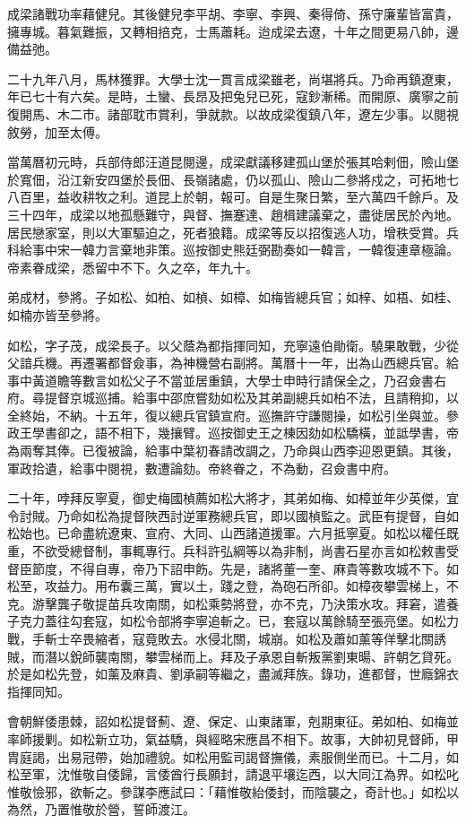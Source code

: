 \begin{pinyinscope}
成梁諸戰功率藉健兒。其後健兒李平胡、李寧、李興、秦得倚、孫守廉輩皆富貴，擁專城。暮氣難振，又轉相掊克，士馬蕭耗。迨成梁去遼，十年之間更易八帥，邊備益弛。

二十九年八月，馬林獲罪。大學士沈一貫言成梁雖老，尚堪將兵。乃命再鎮遼東，年已七十有六矣。是時，土蠻、長昂及把兔兒已死，寇鈔漸稀。而開原、廣寧之前復開馬、木二市。諸部耽市賞利，爭就款。以故成梁復鎮八年，遼左少事。以閱視敘勞，加至太傅。

當萬曆初元時，兵部侍郎汪道昆閱邊，成梁獻議移建孤山堡於張其哈剌佃，險山堡於寬佃，沿江新安四堡於長佃、長嶺諸處，仍以孤山、險山二參將戍之，可拓地七八百里，益收耕牧之利。道昆上於朝，報可。自是生聚日繁，至六萬四千餘戶。及三十四年，成梁以地孤懸難守，與督、撫蹇達、趙楫建議棄之，盡徙居民於內地。居民戀家室，則以大軍驅迫之，死者狼籍。成梁等反以招復逃人功，增秩受賞。兵科給事中宋一韓力言棄地非策。巡按御史熊廷弼勘奏如一韓言，一韓復連章極論。帝素眷成梁，悉留中不下。久之卒，年九十。

弟成材，參將。子如松、如柏、如楨、如樟、如梅皆總兵官；如梓、如梧、如桂、如楠亦皆至參將。

如松，字子茂，成梁長子。以父蔭為都指揮同知，充寧遠伯勛衛。驍果敢戰，少從父諳兵機。再遷署都督僉事，為神機營右副將。萬曆十一年，出為山西總兵官。給事中黃道瞻等數言如松父子不當並居重鎮，大學士申時行請保全之，乃召僉書右府。尋提督京城巡捕。給事中邵庶嘗劾如松及其弟副總兵如柏不法，且請稍抑，以全終始，不納。十五年，復以總兵官鎮宣府。巡撫許守謙閱操，如松引坐與並。參政王學書卻之，語不相下，幾攘臂。巡按御史王之棟因劾如松驕橫，並詆學書，帝為兩奪其俸。已復被論，給事中葉初春請改調之，乃命與山西李迎恩更鎮。其後，軍政拾遺，給事中閱視，數遭論劾。帝終眷之，不為動，召僉書中府。

二十年，哱拜反寧夏，御史梅國楨薦如松大將才，其弟如梅、如樟並年少英傑，宜令討賊。乃命如松為提督陜西討逆軍務總兵官，即以國楨監之。武臣有提督，自如松始也。已命盡統遼東、宣府、大同、山西諸道援軍。六月抵寧夏。如松以權任既重，不欲受總督制，事輒專行。兵科許弘綱等以為非制，尚書石星亦言如松敕書受督臣節度，不得自專，帝乃下詔申飭。先是，諸將董一奎、麻貴等數攻城不下。如松至，攻益力。用布囊三萬，實以土，踐之登，為砲石所卻。如樟夜攀雲梯上，不克。游擊龔子敬提苗兵攻南關，如松乘勢將登，亦不克，乃決策水攻。拜窘，遣養子克力蓋往勾套寇，如松令部將李寧追斬之。已，套寇以萬餘騎至張亮堡。如松力戰，手斬士卒畏縮者，寇竟敗去。水侵北關，城崩。如松及蕭如薰等佯擊北關誘賊，而潛以銳師襲南關，攀雲梯而上。拜及子承恩自斬叛黨劉東暘、許朝乞貸死。於是如松先登，如薰及麻貴、劉承嗣等繼之，盡滅拜族。錄功，進都督，世廕錦衣指揮同知。

會朝鮮倭患棘，詔如松提督薊、遼、保定、山東諸軍，剋期東征。弟如柏、如梅並率師援剿。如松新立功，氣益驕，與經略宋應昌不相下。故事，大帥初見督師，甲胄庭謁，出易冠帶，始加禮貌。如松用監司謁督撫儀，素服側坐而已。十二月，如松至軍，沈惟敬自倭歸，言倭酋行長願封，請退平壤迄西，以大同江為界。如松叱惟敬憸邪，欲斬之。參謀李應試曰：「藉惟敬紿倭封，而陰襲之，奇計也。」如松以為然，乃置惟敬於營，誓師渡江。


\end{pinyinscope}
